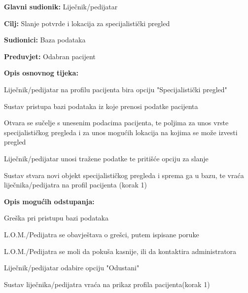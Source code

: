 					\noindent {}
					\begin{packed_item}
						
						\item \textbf{Glavni sudionik: }Liječnik/pedijatar
						\item  \textbf{Cilj:} Slanje potvrde i lokacija za specijalistički pregled
						\item  \textbf{Sudionici:} Baza podataka
						\item  \textbf{Preduvjet:} Odabran pacijent
						\item  \textbf{Opis osnovnog tijeka:}
						
						\item[] \begin{packed_enum}
							
							\item Liječnik/pedijatar na profilu pacijenta bira opciju "Specijalistički pregled"
							\item Sustav pristupa bazi podataka iz koje prenosi podatke pacijenta
							\item Otvara se sučelje s unesenim podacima pacijenta, te poljima za unos vrste specijalističkog pregleda i za unos mogućih lokacija na kojima se može izvesti pregled
							\item Liječnik/pedijatar unosi tražene podatke te pritišće opciju za slanje
							\item Sustav stvara novi objekt specijalističkog pregleda i sprema ga u bazu, te vraća liječnika/pedijatra na profil pacijenta (korak 1)
						\end{packed_enum}
						\item \textbf{Opis mogućih odstupanja:}
						\item[] \begin{packed_item}
							\item[2/5.a] Greška pri pristupu bazi podataka
							\item[] \begin{packed_enum}
								
								\item L.O.M./Pedijatra se obavještava o grešci, putem ispisane poruke
								\item L.O.M./Pedijatra se moli da pokuša kasnije, ili da kontaktira administratora
								
							\end{packed_enum}
								\item[4.a] Liječnik/pedijatar odabire opciju "Odustani"
								\item[] \begin{packed_enum}
									\item Sustav liječnika/pedijatra vraća na prikaz profila pacijenta(korak 1)
								\end{packed_enum}
						\end{packed_item}
						
					\end{packed_item}
					
